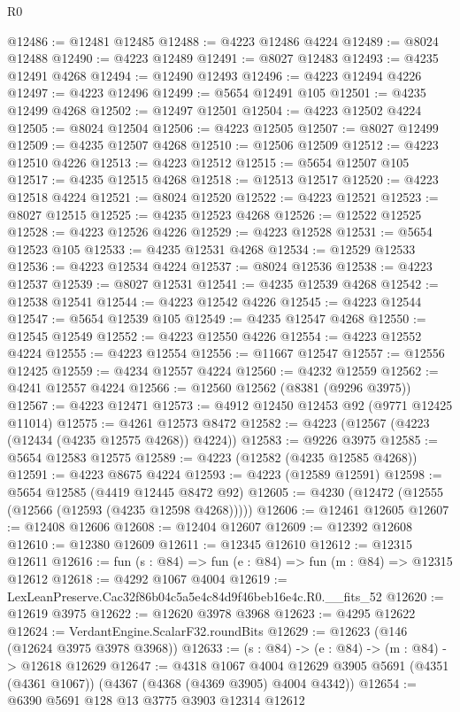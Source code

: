 \begin{lexlean}{R0}
\begin{coremodule}
@12486 := @12481 @12485
@12488 := @4223 @12486 @4224
@12489 := @8024 @12488
@12490 := @4223 @12489
@12491 := @8027 @12483
@12493 := @4235 @12491 @4268
@12494 := @12490 @12493
@12496 := @4223 @12494 @4226
@12497 := @4223 @12496
@12499 := @5654 @12491 @105
@12501 := @4235 @12499 @4268
@12502 := @12497 @12501
@12504 := @4223 @12502 @4224
@12505 := @8024 @12504
@12506 := @4223 @12505
@12507 := @8027 @12499
@12509 := @4235 @12507 @4268
@12510 := @12506 @12509
@12512 := @4223 @12510 @4226
@12513 := @4223 @12512
@12515 := @5654 @12507 @105
@12517 := @4235 @12515 @4268
@12518 := @12513 @12517
@12520 := @4223 @12518 @4224
@12521 := @8024 @12520
@12522 := @4223 @12521
@12523 := @8027 @12515
@12525 := @4235 @12523 @4268
@12526 := @12522 @12525
@12528 := @4223 @12526 @4226
@12529 := @4223 @12528
@12531 := @5654 @12523 @105
@12533 := @4235 @12531 @4268
@12534 := @12529 @12533
@12536 := @4223 @12534 @4224
@12537 := @8024 @12536
@12538 := @4223 @12537
@12539 := @8027 @12531
@12541 := @4235 @12539 @4268
@12542 := @12538 @12541
@12544 := @4223 @12542 @4226
@12545 := @4223 @12544
@12547 := @5654 @12539 @105
@12549 := @4235 @12547 @4268
@12550 := @12545 @12549
@12552 := @4223 @12550 @4226
@12554 := @4223 @12552 @4224
@12555 := @4223 @12554
@12556 := @11667 @12547
@12557 := @12556 @12425
@12559 := @4234 @12557 @4224
@12560 := @4232 @12559
@12562 := @4241 @12557 @4224
@12566 := @12560 @12562 (@8381 (@9296 @3975))
@12567 := @4223 @12471
@12573 := @4912 @12450 @12453 @92 (@9771 @12425 @11014)
@12575 := @4261 @12573 @8472
@12582 := @4223 (@12567 (@4223 (@12434 (@4235 @12575 @4268)) @4224))
@12583 := @9226 @3975
@12585 := @5654 @12583 @12575
@12589 := @4223 (@12582 (@4235 @12585 @4268))
@12591 := @4223 @8675 @4224
@12593 := @4223 (@12589 @12591)
@12598 := @5654 @12585 (@4419 @12445 @8472 @92)
@12605 := @4230 (@12472 (@12555 (@12566 (@12593 (@4235 @12598 @4268)))))
@12606 := @12461 @12605
@12607 := @12408 @12606
@12608 := @12404 @12607
@12609 := @12392 @12608
@12610 := @12380 @12609
@12611 := @12345 @12610
@12612 := @12315 @12611
@12616 := fun (s : @84) => fun (e : @84) => fun (m : @84) => @12315 @12612
@12618 := @4292 @1067 @4004
@12619 := LexLeanPreserve.Cac32f86b04c5a5e4c84d9f46beb16e4c.R0.__fits_52
@12620 := @12619 @3975
@12622 := @12620 @3978 @3968
@12623 := @4295 @12622
@12624 := VerdantEngine.ScalarF32.roundBits
@12629 := @12623 (@146 (@12624 @3975 @3978 @3968))
@12633 := (s : @84) -> (e : @84) -> (m : @84) -> @12618 @12629
@12647 := @4318
    @1067
    @4004
    @12629
    @3905
    @5691
    (@4351 (@4361 @1067))
    (@4367 (@4368 (@4369 @3905) @4004 @4342))
@12654 := @6390 @5691 @128 @13 @3775 @3903 @12314 @12612

\end{coremodule}
\end{lexlean}

